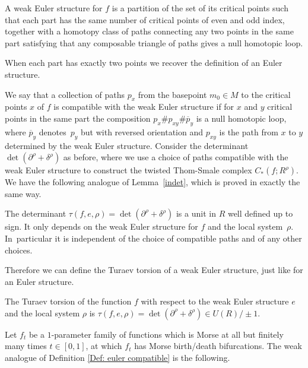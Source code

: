\begin{definition}\label{Definition: weak} A weak Euler structure for $f$ is a partition of the set of its critical points such that each part has the same number of critical points of even and odd index, together with a homotopy class of paths connecting any two points in the same part satisfying that any composable triangle of paths gives a null homotopic loop.
\end{definition}

\begin{remark} When each part has exactly two points we recover the definition of an Euler structure.
\end{remark}

We say that a collection of paths $p_x$ from the basepoint $m_0\in M$ to the critical points $x$ of $f$ is compatible with the weak Euler structure if for $x$ and $y$ critical points in the same part the composition $p_x \# p_{xy} \# \overline{p}_y $ is a null homotopic loop, where $\overline{p}_y$ denotes~$p_y$ but with reversed orientation and $p_{xy}$ is the path from $x$ to $y$ determined by the weak Euler structure. Consider the determinant $\det(\partial^\rho + \delta^\rho)$ as before, where we use a choice of paths compatible with the weak Euler structure to construct the twisted Thom-Smale complex $C_*(f; R^\rho)$. We have the following analogue of Lemma~\ref{indet}, which is proved in exactly the same way.

\begin{lemma}\label{weakindet}
The determinant $\tau(f,e,\rho)=\det(\partial^\rho + \delta^\rho)$ is a unit in $R$ well defined up to sign. It only depends on the weak Euler structure for $f$ and the local system~$\rho$. In~particular it is independent of the choice of compatible paths and of any other choices.
\end{lemma}

Therefore we can define the Turaev torsion of a weak Euler structure, just like for an Euler structure.

\begin{definition}
The Turaev torsion of the function $f$ with respect to the weak Euler structure $e$ and the local system $\rho$ is $\tau(f, e, \rho)=\det(\partial^\rho + \delta^\rho) \in U(R) / \pm 1$.
\end{definition}

Let $f_t$ be a $1$-parameter family of functions which is Morse at all but finitely many times $t \in [0,1]$, at which $f_t$ has Morse birth/death bifurcations. The weak analogue of Definition \ref{Def: euler compatible} is the following.

